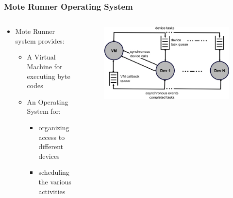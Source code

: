 \begin{frame}[fragile]
  \frametitle{Mote Runner Operating System}
  \begin{columns}
    \begin{column}{.48\linewidth}
    	\begin{itemize}
	    	\item Mote Runner system provides:
	    	\begin{itemize}
		    	\item A Virtual Machine for executing byte codes
		    	\item An Operating System for:
		    	\begin{itemize}
			    	\item  organizing access to different devices 
			    	\item scheduling the various activities
		    	\end{itemize} 
		    \end{itemize}
    	\end{itemize}
    \end{column}
    \hfill
    \begin{column}{.5\linewidth}
    	\begin{figure}
	  \centering
	  \includegraphics[width=\textwidth]{img/vm-dev.jpg}
    	\end{figure}
    \end{column}
  \end{columns}
\end{frame}

